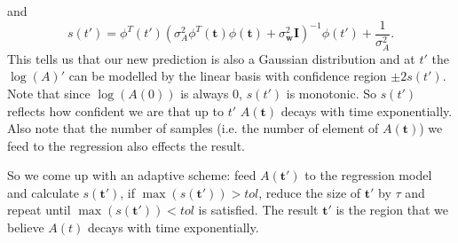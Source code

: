 \documentclass[
reprint,
 amsmath,amssymb,
 aps,
url
]{revtex4-1}
\begin{document}
and 
\begin{equation}
	s(t')=\phi^T(t')(\sigma^2_A\phi^T(\mathbf{t})\phi(\mathbf{t})+\sigma^2_\mathbf{w}\mathbf{I})^{-1}\phi(t')+\frac{1}{\sigma^2_A}.
\end{equation}
This tells us that our new prediction is also a Gaussian distribution and at $t'$ the $\log(A)'$ can be modelled by the linear basis with confidence region $\pm 2s(t')$. Note that since $\log(A(0))$ is always $0$, $s(t')$ is monotonic. So $s(t')$ reflects how confident we are that up to $t'$ $A(\mathbf{t})$ decays with time exponentially. Also note that the number of samples (i.e. the number of element of $A(\mathbf{t})$) we feed to the regression also effects the result.

So we come up with an adaptive scheme: feed $A(\mathbf{t}')$ to the regression model and calculate $s(\mathbf{t'})$, if $\max(s(\mathbf{t}'))>tol$, reduce the size of $\mathbf{t}'$ by $\tau$ and repeat until $\max(s(\mathbf{t}'))<tol$ is satisfied. The result $\mathbf{t}'$ is the region that we believe $A(t)$ decays with time exponentially. 


\end{document}
